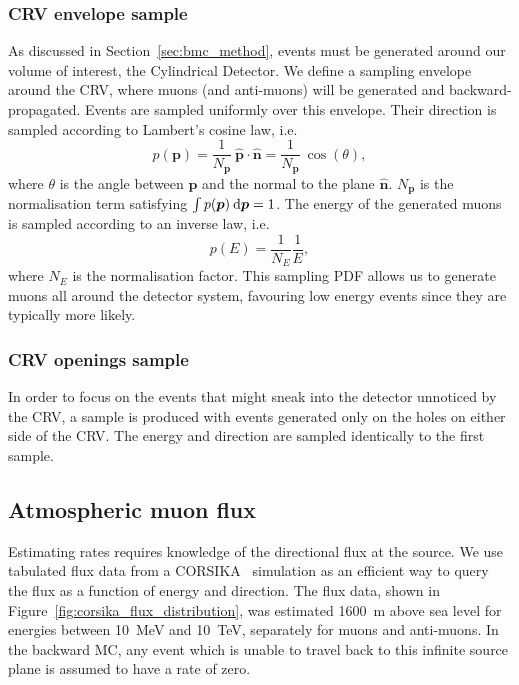 \subsubsection{CRV envelope sample}
As discussed in Section~\ref{sec:bmc_method}, events must be generated around
our volume of interest, the Cylindrical Detector. We define a sampling
envelope around the CRV, where muons (and anti-muons) will be generated and
backward-propagated. Events are sampled uniformly over this
envelope. Their direction is sampled according to Lambert's cosine law, i.e.\ 
$$
p(\bm{p}) = 
    \frac{1}{N_{\bm{p}}} \ \hat{\bm{p}} \cdot \hat{\bm{n}} = 
    \frac{1}{N_{\bm{p}}}\:\cos(\theta),
$$
where $\theta$ is the angle between $\bm{p}$ and the normal to the plane
$\hat{\bm{n}}$. $N_{\bm{p}}$ is the normalisation term satisfying 
$\int p(\bm{p}) \: \textnormal{d}\bm{p} = 1$.
The energy of the generated muons is sampled according to an inverse law, i.e.\ 
$$
p(E) = \frac{1}{N_E}  \frac{1}{E},
$$
where $N_E$ is the normalisation factor. 
This sampling PDF allows us to generate muons all around the detector system,
favouring low energy events since they are typically more likely. 

\subsubsection{CRV openings sample}
In order to focus on the events that might sneak into the detector unnoticed by
the CRV, a sample is produced with events generated only on the holes on either
side of the CRV. The energy and direction are sampled identically to the first
sample.



\subsection{Atmospheric muon flux}
Estimating rates requires knowledge of the directional flux at the source. We
use tabulated flux data from a CORSIKA~\cite{corsika} simulation as an efficient
way to query the flux as a function of energy and direction. The flux data,
shown in Figure~\ref{fig:corsika_flux_distribution}, was estimated
\SI{1600}{\metre} above sea level for energies between \SI{10}{\MeV} and
\SI{10}{\TeV}, separately for muons and anti-muons. In the backward MC, any
event which is unable to travel back to this infinite source plane is assumed to
have a rate of zero.

